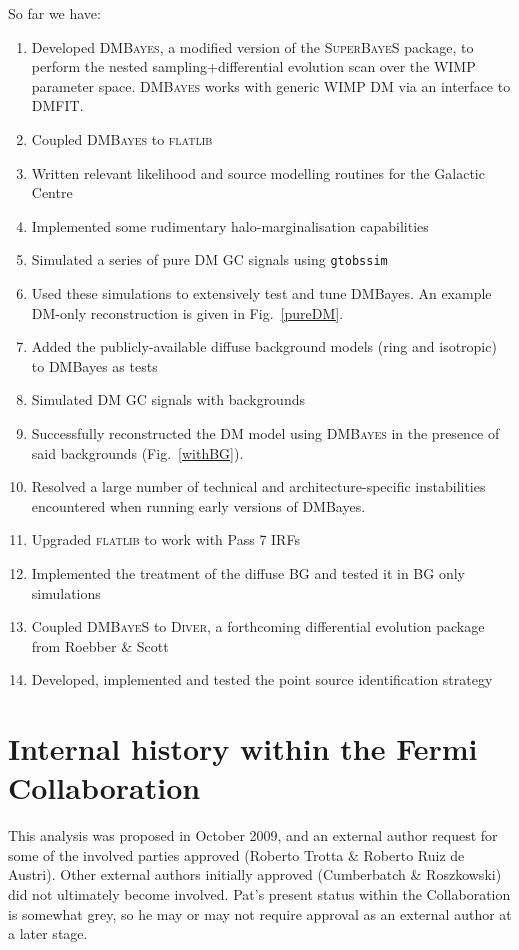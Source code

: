 \documentclass{article}
\begin{document}
So far we have:
\begin{enumerate}
\item Developed \textsc{DMBayes}, a modified version of the \textsc{SuperBayeS} package, to perform the nested sampling+differential evolution scan over the WIMP parameter space.  \textsc{DMBayes} works with generic WIMP DM via an interface to \textsc{DMFIT}.
\item Coupled \textsc{DMBayes} to \textsc{flatlib}
\item Written relevant likelihood and source modelling routines for the Galactic Centre
\item Implemented some rudimentary halo-marginalisation capabilities
\item Simulated a series of pure DM GC signals using \texttt{gtobssim}
\item Used these simulations to extensively test and tune DMBayes.  An example DM-only reconstruction is given in Fig.~\ref{pureDM}.
\item Added the publicly-available diffuse background models (ring and isotropic) to DMBayes as tests
\item Simulated DM GC signals with backgrounds
\item Successfully reconstructed the DM model using \textsc{DMBayes} in the presence of said backgrounds (Fig.~\ref{withBG}).
\item Resolved a large number of technical and architecture-specific instabilities encountered when running early versions of DMBayes.
\item Upgraded \textsc{flatlib} to work with Pass 7 IRFs
\item Implemented the treatment of the diffuse BG and tested it in BG only simulations
\item Coupled \textsc{DMBayeS} to \textsc{Diver}, a forthcoming differential evolution package from Roebber \& Scott
\item Developed, implemented and tested the point source identification strategy
\end{enumerate}

\section{Internal history within the Fermi Collaboration}

This analysis was proposed in October 2009, and an external author request for some of the involved parties approved (Roberto Trotta \& Roberto Ruiz de Austri).  Other external authors initially approved (Cumberbatch \& Roszkowski) did not ultimately become involved.  Pat's present status within the Collaboration is somewhat grey, so he may or may not require approval as an external author at a later stage.
\end{document}
